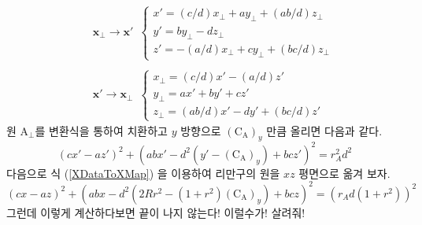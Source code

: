 \documentclass[chapter,a4paper,10pt]{oblivoir}
\begin{document}
\begin{eqnarray}
&&\mathbf{x}_\perp\rightarrow\mathbf{x}'\,\,\,
\left\{ \begin{array}{ll}
x' = ({c}/{d})x_\perp + ay_\perp + ({ab}/{d})z_\perp\\
y' = by_\perp - dz_\perp\\
z' = -({a}/{d})x_\perp + cy_\perp + ({bc}/{d})z_\perp
\end{array} \right.\\
\nonumber\\
&&\mathbf{x}'\rightarrow\mathbf{x}_\perp\,\,\,
\left\{ \begin{array}{ll}
x_\perp = ({c}/{d})x' - ({a}/{d})z'\\
y_\perp = ax' + by' + cz'\\
z_\perp = ({ab}/{d})x' - dy' + ({bc}/{d})z'
\end{array} \right.
\end{eqnarray}
원 $\textrm{A}_\perp$를 변환식을 통하여 치환하고
$y$ 방향으로 $(\textrm{C}_\textrm{A})_y$ 만큼 올리면 다음과 같다.
\begin{equation}
\left(cx' - az'\right)^2 + \left(abx' - d^2(y'-(\textrm{C}_\textrm{A})_y) + bcz'\right)^2 = r_A^2d^2
\end{equation}
다음으로 식 (\ref{XDataToXMap}) 을 이용하여 리만구의 원을 $xz$ 평면으로 옮겨 보자.
\begin{equation}
\left(cx - az\right)^2 + \left(abx - d^2\left(2Rr^2-(1+r^2)(\textrm{C}_\textrm{A})_y\right) + bcz\right)^2 = \left(r_Ad(1+r^2)\right)^2
\end{equation}
그런데 이렇게 계산하다보면 끝이 나지 않는다! 이럴수가! 살려줘!
\end{document}
